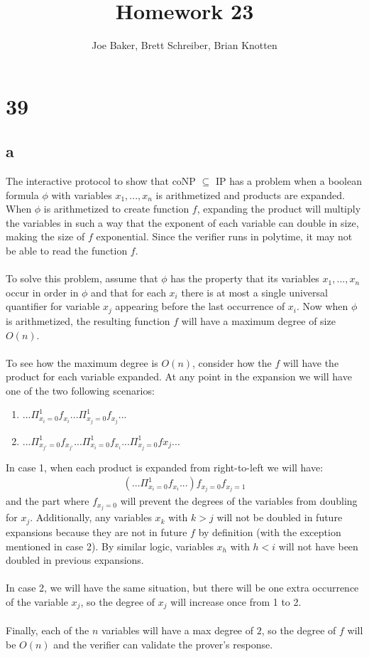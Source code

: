 \documentclass[letterpaper,notitlepage,twoside]{article}
\begin{document}
\title{Homework 23}
\author{Joe Baker, Brett Schreiber, Brian Knotten}
\maketitle

\section*{39}
\subsection*{a}
The interactive protocol to show that coNP $\subseteq$ IP has a problem when a boolean formula $\phi$ with variables $x_1,...,x_n$ is arithmetized and products are expanded. When $\phi$ is arithmetized to create function $f$, expanding the product will multiply the variables in such a way that the exponent of each variable can double in size, making the size of $f$ exponential. Since the verifier runs in polytime, it may not be able to read the function $f$.
\\\\
To solve this problem, assume that $\phi$ has the property that its variables $x_1,...,x_n$ occur in order in $\phi$ and that for each $x_i$ there is at most a single universal quantifier for variable $x_j$ appearing before the last occurrence of $x_i$. Now when $\phi$ is arithmetized, the resulting function $f$ will have a maximum degree of size $O(n)$.
\\\\
To see how the maximum degree is $O(n)$, consider how the $f$ will have the product for each variable expanded. At any point in the expansion we will have one of the two following scenarios:
\begin{enumerate}
\item $...\Pi_{x_i=0}^1f_{x_i}...\Pi_{x_j=0}^1f_{x_j}...$
\item $...\Pi_{x_{j'}=0}^1f_{x_{j'}}...\Pi_{x_i=0}^1f_{x_i}...\Pi_{x_j=0}^1f{x_j}...$
\end{enumerate}
In case 1, when each product is expanded from right-to-left we will have:
\begin{align*}
\left(...\Pi_{x_i=0}^1f_{x_i}...\right)f_{x_j=0}f_{x_j=1}
\end{align*}
and the part where $f_{x_j=0}$ will prevent the degrees of the variables from doubling for $x_j$. Additionally, any variables $x_k$ with $k > j$ will not be doubled in future expansions because they are not in future $f$ by definition (with the exception mentioned in case 2). By similar logic, variables $x_h$ with $h < i$ will not have been doubled in previous expansions.
\\\\
In case 2, we will have the same situation, but there will be one extra occurrence of the variable $x_j$, so the degree of $x_j$ will increase once from 1 to 2.
\\\\
Finally, each of the $n$ variables will have a max degree of $2$, so the degree of $f$ will be $O(n)$ and the verifier can validate the prover's response.
\end{document}
